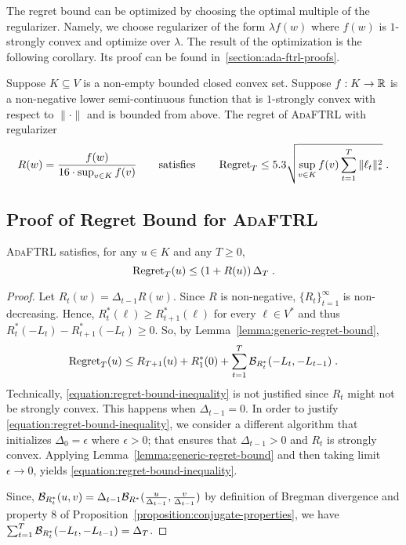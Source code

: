 The regret bound can be optimized by choosing the optimal multiple of the
regularizer.  Namely, we choose regularizer of the form $\lambda f(w)$ where
$f(w)$ is $1$-strongly convex and optimize over $\lambda$. The result of the
optimization is the following corollary.  Its proof can be found
in~\ref{section:ada-ftrl-proofs}.

\begin{corollary}
\label{corollary:ada-ftrl-regret-bound}
Suppose $K \subseteq V$ is a non-empty bounded closed convex set. Suppose $f:K
\to \mathbb{R}$ is a non-negative lower semi-continuous function that is $1$-strongly
convex with respect to $\|\cdot\|$ and is bounded from above.  The regret of
\textsc{AdaFTRL} with regularizer
$$
R(w) = \frac{f(w)}{16 \cdot \sup_{v \in K} f(v)}
\qquad \text{satisfies} \qquad
\operatorname{Regret}_T \le
5.3 \sqrt{\sup_{v \in K} f(v) \sum_{t=1}^T \|\ell_t\|_*^2} \; .
$$
\end{corollary}

\subsection{Proof of Regret Bound for \textsc{AdaFTRL}}
\label{section:ada-ftrl-regret-bound}

\begin{lemma}
\label{lemma:initial-regret-bound}
\textsc{AdaFTRL} satisfies, for any $u \in K$ and any $T \ge 0$,
$$
\operatorname{Regret}_T(u) \le \left(1 + R(u) \right) \Delta_T \; .
$$
\end{lemma}

\begin{proof}
Let $R_t(w) = \Delta_{t-1} R(w)$. Since $R$ is non-negative,
$\{R_t\}_{t=1}^\infty$ is non-decreasing.  Hence, $R_t^*(\ell) \ge
R_{t+1}^*(\ell)$ for every $\ell \in V^*$ and thus $R_t^*(-L_t) -
R_{t+1}^*(-L_t) \ge 0$.  So, by Lemma~\ref{lemma:generic-regret-bound},
\begin{equation}
\label{equation:regret-bound-inequality}
\operatorname{Regret}_T(u) \le R_{T+1}(u) + R_1^*(0) + \sum_{t=1}^{T} \mathcal{B}_{R_t^*}(-L_t, -L_{t-1}) \; .
\end{equation}
Technically, \eqref{equation:regret-bound-inequality} is not justified since
$R_t$ might not be strongly convex. This happens when $\Delta_{t-1} = 0$. In
order to justify \eqref{equation:regret-bound-inequality}, we consider a
different algorithm that initializes $\Delta_0 = \epsilon$ where $\epsilon >
0$; that ensures that $\Delta_{t-1} > 0$ and $R_t$ is strongly convex.
Applying  Lemma~\ref{lemma:generic-regret-bound} and then taking limit
$\epsilon \to 0$, yields \eqref{equation:regret-bound-inequality}.

Since, $\mathcal{B}_{R_t^*}(u,v) = \Delta_{t-1} \mathcal{B}_{R^*}(\frac{u}{\Delta_{t-1}},
\frac{v}{\Delta_{t-1}})$ by definition of Bregman divergence and property 8 of
Proposition~\ref{proposition:conjugate-properties}, we have $\sum_{t=1}^T
\mathcal{B}_{R_t^*}(-L_t, -L_{t-1}) = \Delta_T$.
\end{proof}


